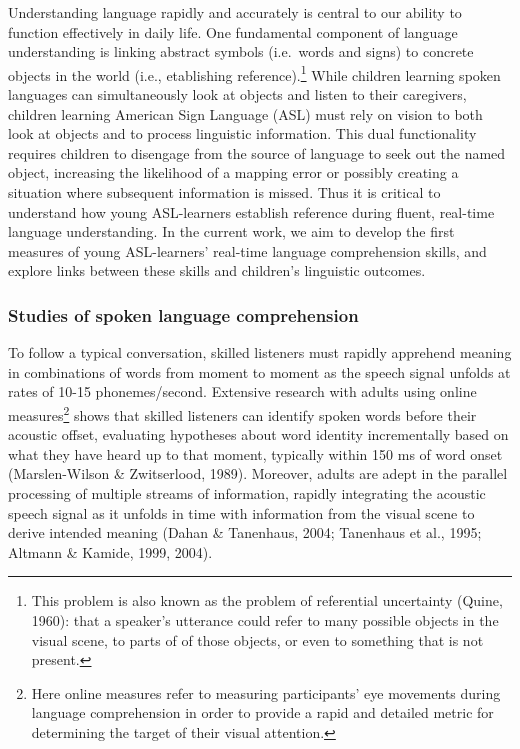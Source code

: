 \documentclass[12pt,]{article}
\let\rmarkdownfootnote\footnote%
\def\footnote{\protect\rmarkdownfootnote}
\begin{document}
Understanding language rapidly and accurately is central to our ability
to function effectively in daily life. One fundamental component of
language understanding is linking abstract symbols (i.e.~words and
signs) to concrete objects in the world (i.e., etablishing
reference).\footnote{This problem is also known as the problem of
  referential uncertainty (Quine, 1960): that a speaker's utterance
  could refer to many possible objects in the visual scene, to parts of
  of those objects, or even to something that is not present.} While
children learning spoken languages can simultaneously look at objects
and listen to their caregivers, children learning American Sign Language
(ASL) must rely on vision to both look at objects and to process
linguistic information. This dual functionality requires children to
disengage from the source of language to seek out the named object,
increasing the likelihood of a mapping error or possibly creating a
situation where subsequent information is missed. Thus it is critical to
understand how young ASL-learners establish reference during fluent,
real-time language understanding. In the current work, we aim to develop
the first measures of young ASL-learners' real-time language
comprehension skills, and explore links between these skills and
children's linguistic outcomes.

\subsubsection{Studies of spoken language
comprehension}\label{studies-of-spoken-language-comprehension}

To follow a typical conversation, skilled listeners must rapidly
apprehend meaning in combinations of words from moment to moment as the
speech signal unfolds at rates of 10-15 phonemes/second. Extensive
research with adults using online measures\footnote{Here online measures
  refer to measuring participants' eye movements during language
  comprehension in order to provide a rapid and detailed metric for
  determining the target of their visual attention.} shows that skilled
listeners can identify spoken words before their acoustic offset,
evaluating hypotheses about word identity incrementally based on what
they have heard up to that moment, typically within 150 ms of word onset
(Marslen-Wilson \& Zwitserlood, 1989). Moreover, adults are adept in the
parallel processing of multiple streams of information, rapidly
integrating the acoustic speech signal as it unfolds in time with
information from the visual scene to derive intended meaning (Dahan \&
Tanenhaus, 2004; Tanenhaus et al., 1995; Altmann \& Kamide, 1999, 2004).
\end{document}
